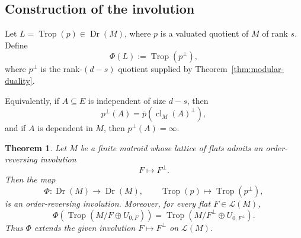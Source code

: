 \documentclass[12pt]{article}
\newcommand{\Trop}{\operatorname{Trop}}
\newcommand{\Dr}{\operatorname{Dr}}
\newcommand{\cl}{\operatorname{cl}}
\newcommand{\cL}{\mathcal L}
\theoremstyle{plain}
\newtheorem{theorem}{Theorem}[section]
\theoremstyle{definition}
\begin{document}
\subsection{Construction of the involution}

Let \(L=\Trop(p)\in \Dr(M)\), where \(p\) is a valuated quotient of \(M\) of rank \(s\).  Define
\[
   \Phi(L):=\Trop(p^\perp),
\]
where \(p^\perp\) is the rank-\((d-s)\) quotient supplied by Theorem~\ref{thm:modular-duality}.

Equivalently, if \(A\subseteq E\) is independent of size \(d-s\), then
\[
   p^\perp(A)=\bar p(\cl_M(A)^\perp),
\]
and if \(A\) is dependent in \(M\), then \(p^\perp(A)=\infty\).

\begin{theorem}\label{thm:main}
Let \(M\) be a finite matroid whose lattice of flats admits an order-reversing involution
\[
   F\longmapsto F^\perp.
\]
Then the map
\[
   \Phi:\Dr(M)\longrightarrow \Dr(M),\qquad
   \Trop(p)\longmapsto \Trop(p^\perp),
\]
is an order-reversing involution.  Moreover, for every flat \(F\in \cL(M)\),
\[
   \Phi\!\left(\Trop(M/F\oplus U_{0,F})\right)
   =
   \Trop(M/F^\perp\oplus U_{0,F^\perp}).
\]
Thus \(\Phi\) extends the given involution \(F\mapsto F^\perp\) on \(\cL(M)\).
\end{theorem}
\end{document}
